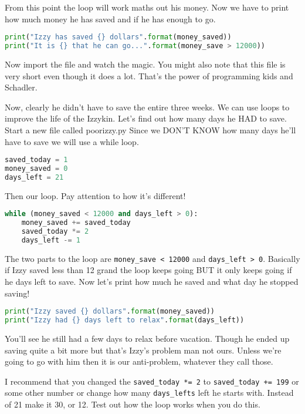 \documentclass{article}
\begin{document}
From this point the loop will work maths out his money. 
Now we have to print how much money he has saved and if he has enough to go.

\begin{lstlisting}[language=Python]
print("Izzy has saved {} dollars".format(money_saved))
print("It is {} that he can go...".format(money_save > 12000))
\end{lstlisting}

Now import the file and watch the magic. 
You might also note that this file is very short even though it does a lot. 
That's the power of programming kids and Schadler. 

Now, clearly he didn't have to save the entire three weeks. 
We can use loops to improve the life of the Izzykin. 
Let's find out how many days he HAD to save.
Start a new file called poorizzy.py
Since we DON'T KNOW how many days he'll have to save we will use a while loop.
\begin{lstlisting}[language=Python]
saved_today = 1
money_saved = 0
days_left = 21
\end{lstlisting}

Then our loop. 
Pay attention to how it's different!

\begin{lstlisting}[language=Python]
while (money_saved < 12000 and days_left > 0):
    money_saved += saved_today
    saved_today *= 2
    days_left -= 1
\end{lstlisting}
The two parts to the loop are \verb|money_save < 12000| and \verb|days_left > 0|. 
Basically if Izzy saved less than 12 grand the loop keeps going BUT it only keeps going if 
he days left to save.
Now let's print how much he saved and what day he stopped saving!
\begin{lstlisting}[language=Python]
print("Izzy saved {} dollars".format(money_saved))
print("Izzy had {} days left to relax".format(days_left))
\end{lstlisting}

You'll see he still had a few days to relax before vacation. Though he ended up saving quite a bit more
but that's Izzy's problem man not ours. 
Unless we're going to go with him then it is our anti-problem, whatever they call those.

I recommend that you changed the \verb|saved_today *= 2| to \verb|saved_today += 199| or some other 
number or change how many \verb|days_lefts| left he starts with. 
Instead of 21 make it 30, or 12. 
Test out how the loop works when you do this. 
\end{document}
